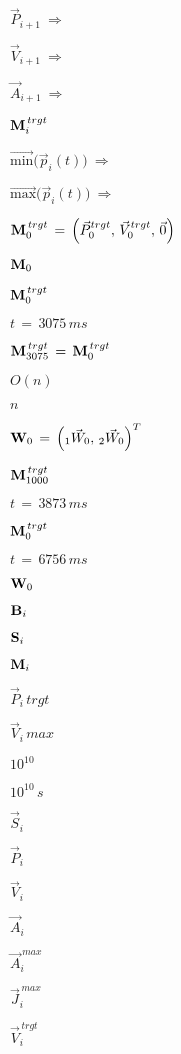 \documentclass{article}
\begin{document}
$ \vec{P}_{i+1} \ \Longrightarrow \ $
\pagebreak

$ \vec{V}_{i+1} \ \Longrightarrow \ $
\pagebreak

$ \vec{A}_{i+1} \ \Longrightarrow \ $
\pagebreak

$ {\bf M}_i^{\,trgt} $
\pagebreak

$ \overrightarrow{\mbox{min}}\Big(\vec{p}_i\left(t\right)\Big) \ \Longrightarrow \ $
\pagebreak

$ \overrightarrow{\mbox{max}}\Big(\vec{p}_i\left(t\right)\Big) \ \Longrightarrow \ $
\pagebreak

${\bf M}_0^{\,trgt}\,=\,\left(\vec{P}_{0}^{trgt},\,\vec{V}_{0}^{trgt},\,\vec{0}\right)$
\pagebreak

${\bf M}_0 $
\pagebreak

${\bf M}_0^{\,trgt} $
\pagebreak

$t\,=\,3075\,ms$
\pagebreak

${\bf M}_{3075}^{\,trgt}\,=\,{\bf M}_0^{\,trgt}$
\pagebreak

$ O(n) $
\pagebreak

$ n $
\pagebreak

$ {\bf W}_0\,=\,\left(\,\!_1\vec{W}_0,\,_2\vec{W}_0\right)^T $
\pagebreak

$ {\bf M}_{1000}^{\,trgt} $
\pagebreak

$ t\,=\,3873\,ms $
\pagebreak

$ {\bf M}_0^{\,trgt} $
\pagebreak

$ t\,=\,6756\,ms $
\pagebreak

$ {\bf W}_0 $
\pagebreak

$ {\bf B}_i $
\pagebreak

$ {\bf S}_i $
\pagebreak

$ {\bf M}_{i} $
\pagebreak

$ \vec{P}_i{\,trgt} $
\pagebreak

$ \vec{V}_i{\,max} $
\pagebreak

$ 10^{10} $
\pagebreak

$10^{10}\,s$
\pagebreak

$ \vec{S}_{i} $
\pagebreak

$ \vec{P}_{i} $
\pagebreak

$ \vec{V}_{i} $
\pagebreak

$ \vec{A}_{i} $
\pagebreak

$ \vec{A}_{i}^{\,max} $
\pagebreak

$ \vec{J}_{i}^{\,max} $
\pagebreak

$ \vec{V}_{i}^{\,trgt} $
\pagebreak
\end{document}
